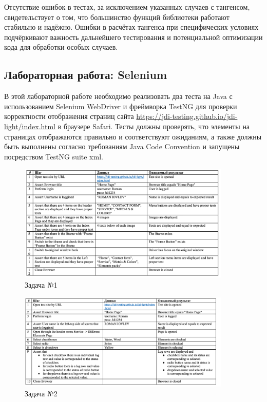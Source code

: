 \documentclass[areasetadvanced]{scrartcl}
\begin{document}
Отсутствие ошибок в тестах, за исключением указанных случаев с тангенсом, свидетельствует о том, что большинство функций библиотеки работают стабильно и надёжно. Ошибки в расчётах тангенса при специфических условиях подчёркивают важность дальнейшего тестирования и потенциальной оптимизации кода для обработки особых случаев.
\newpage
\subsection{Лабораторная работа: Selenium}
В этой лабораторной работе необходимо реализовать два теста на Java с использованием Selenium WebDriver и фреймворка TestNG для проверки корректности отображения страниц сайта \url{https://jdi-testing.github.io/jdi-light/index.html} в браузере Safari. Тесты должны проверять, что элементы на страницах отображаются правильно и соответствуют ожиданиям, а также должны быть выполнены согласно требованиям Java Code Convention и запущены посредством TestNG suite xml.

\begin{figure}[H]
	\centering
	\includegraphics[width=0.9\textwidth]{images/Lab2.1.png}
	\caption{Задача №1}
	\label{fig:syntdiag}
\end{figure}

\begin{figure}[H]
	\centering
	\includegraphics[width=0.9\textwidth]{images/Lab2.2.png}
	\caption{Задача №2}
	\label{fig:syntdiag}
\end{figure}
\end{document}
